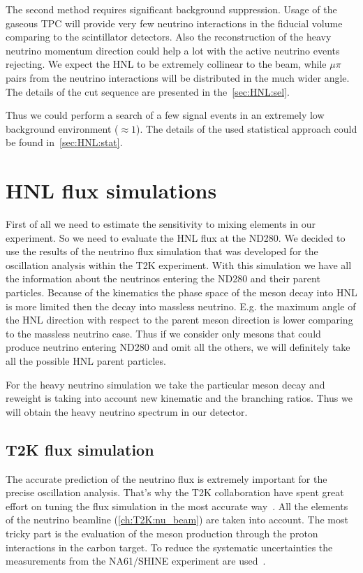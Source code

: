 \documentclass[../main.tex]{subfiles}
\begin{document}
The second method requires significant background suppression. Usage of the gaseous TPC will provide very few neutrino interactions in the fiducial volume comparing to the scintillator detectors. Also the reconstruction of the heavy neutrino momentum direction could help a lot with the active neutrino events rejecting. We expect the HNL to be extremely collinear to the beam, while $\mu\pi$ pairs from the neutrino interactions will be distributed in the much wider angle. The details of the cut sequence are presented in the~\autoref{sec:HNL:sel}.

Thus we could perform a search of a few signal events in an extremely low background environment ($\approx1$). The details of the used statistical approach could be found in~\autoref{sec:HNL:stat}.


\chapter{HNL flux simulations}

First of all we need to estimate the sensitivity to mixing elements in our experiment. So we need to evaluate the HNL flux at the ND280. We decided to use the results of the neutrino flux simulation that was developed for the oscillation analysis within the T2K experiment. With this simulation we have all the information about the neutrinos entering the ND280 and their parent particles. Because of the kinematics the phase space of the meson decay into HNL is more limited then the decay into massless neutrino. E.g. the maximum angle of the HNL direction with respect to the parent meson direction is lower comparing to the massless neutrino case. Thus if we consider only mesons that could produce neutrino entering ND280 and omit all the others, we will definitely take all the possible HNL parent particles.

For the heavy neutrino simulation we take the particular meson decay and reweight is taking into account new kinematic and the branching ratios. Thus we will obtain the heavy neutrino spectrum in our detector.

\section{T2K flux simulation}
The accurate prediction of the neutrino flux is extremely important for the precise oscillation analysis. That's why the T2K collaboration have spent great effort on tuning the flux simulation in the most accurate way~\cite{Abe2013}. All the elements of the neutrino beamline (\autoref{ch:T2K:nu_beam}) are taken into account. The most tricky part is the evaluation of the meson production through the proton interactions in the carbon target. To reduce the systematic uncertainties the measurements from the NA61/SHINE experiment are used~\cite{Collaboration2018}.
\end{document}
